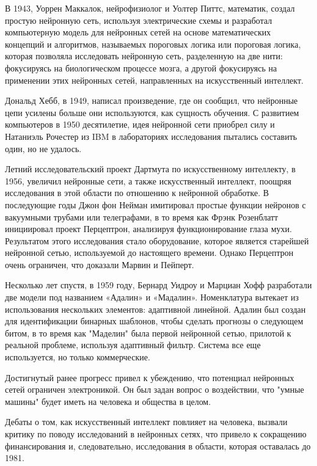  В 1943, Уоррен Маккалок, нейрофизиолог и Уолтер Питтс, математик, создал простую нейронную сеть, используя электрические схемы и
 разработал компьютерную модель для нейронных сетей на основе математических концепций и алгоритмов, 
 называемых пороговых логика или пороговая логика, 
 которая позволяла исследовать нейронную сеть, разделенную на две нити: фокусируясь на биологическом процессе мозга,
 а другой фокусируясь на применении этих нейронных сетей, направленных на искусственный интеллект. 

 Дональд Хебб, в 1949, написал произведение, где он сообщил, что нейронные цепи усилены больше они используются, 
 как сущность обучения. С развитием компьютеров в 1950 десятилетие, идея нейронной сети приобрел силу и Натаниэль Рочестер 
 из IBM в лабораториях исследования пытались составить один, но не удалось.

 Летний исследовательский проект Дартмута по искусственному интеллекту, в 1956,
 увеличил нейронные сети, а также искусственный интеллект,
 поощряя исследования в этой области по отношению к нейронной обработке. 
 В последующие годы Джон фон Нейман имитировал простые функции нейронов с вакуумными трубами или телеграфами,
 в то время как Фрэнк Розенблатт инициировал проект Перцептрон, анализируя функционирование глаза мухи.
 Результатом этого исследования стало оборудование,
 которое является старейшей нейронной сетью, используемой до настоящего времени.
 Однако Перцептрон очень ограничен, что доказали Марвин и Пейперт.


 Несколько лет спустя, в 1959 году, Бернард Уидроу и Марциан Хофф
 разработали две модели под названием «Адалин» и «Мадалин». 
 Номенклатура вытекает из использования нескольких элементов: адаптивной линейной. 
 Адалин был создан для идентификации бинарных шаблонов,
 чтобы сделать прогнозы о следующем битом, 
 в то время как "Маделин" была первой нейронной сетью,
 прилотой к реальной проблеме, используя адаптивный фильтр.
 Система все еще используется, но только коммерческие.

 Достигнутый ранее прогресс привел к убеждению, 
 что потенциал нейронных сетей ограничен электроникой. 
 Он был задан вопрос о воздействии, 
 что "умные машины" будет иметь на человека и общества в целом.

 Дебаты о том, как искусственный интеллект повлияет на человека,
 вызвали критику по поводу исследований в нейронных сетях, 
 что привело к сокращению финансирования и, следовательно,
 исследования в области, которая оставалась до 1981.

